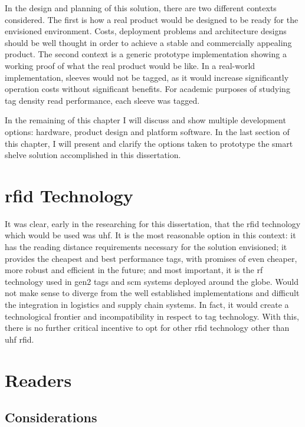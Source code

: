In the design and planning of this solution, there are two different contexts considered. The first is how a real product would be designed to be ready for the envisioned environment. Costs, deployment problems and architecture designs should be well thought in order to achieve a stable and commercially appealing product.
The second context is a generic prototype implementation showing a working proof of what the real product would be like.
In a real-world implementation, sleeves would not be tagged, as it would increase significantly operation costs without significant benefits. For academic purposes of studying tag density read performance, each sleeve was tagged.

In the remaining of this chapter I will discuss and show multiple development options: hardware, product design and platform software. In the last section of this chapter, I will present and clarify the options taken to prototype the smart shelve solution accomplished in this dissertation.

\section{\acs{rfid} Technology}

It was clear, early in the researching for this dissertation, that the \ac{rfid} technology which would be used was \ac{uhf}. 
It is the most reasonable option in this context: it has the reading distance requirements necessary for the solution envisioned; it provides the cheapest and best performance tags, with promises of even cheaper, more robust and efficient in the future; and most important, it is the \ac{rf} technology used in \ac{gen2} tags and \ac{scm} systems deployed around the globe. 
Would not make sense to diverge from the well established implementations and difficult the integration in logistics and supply chain systems.
In fact, it would create a technological frontier and incompatibility in respect to tag technology.
With this, there is no further critical incentive to opt for other \ac{rfid} technology other than \ac{uhf} \ac{rfid}.

\section{Readers}

\subsection{Considerations}

